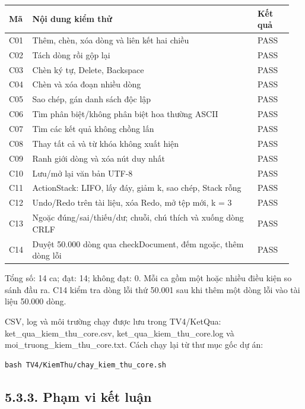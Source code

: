 \begingroup
\small
\setlength{\tabcolsep}{4pt}
\begin{longtable}{@{}p{0.07\linewidth}p{0.76\linewidth}p{0.12\linewidth}@{}}
\toprule
Mã & Nội dung kiểm thử & Kết quả \\
\midrule
\endhead
\bottomrule
\endlastfoot
C01 & Thêm, chèn, xóa dòng và liên kết hai chiều & PASS \\
C02 & Tách dòng rồi gộp lại & PASS \\
C03 & Chèn ký tự, Delete, Backspace & PASS \\
C04 & Chèn và xóa đoạn nhiều dòng & PASS \\
C05 & Sao chép, gán danh sách độc lập & PASS \\
C06 & Tìm phân biệt/không phân biệt hoa thường ASCII & PASS \\
C07 & Tìm các kết quả không chồng lấn & PASS \\
C08 & Thay tất cả và từ khóa không xuất hiện & PASS \\
C09 & Ranh giới dòng và xóa nút duy nhất & PASS \\
C10 & Lưu/mở lại văn bản UTF-8 & PASS \\
C11 & ActionStack: LIFO, lấy đáy, giảm k, sao chép, Stack rỗng & PASS \\
C12 & Undo/Redo trên tài liệu, xóa Redo, mở tệp mới, k = 3 & PASS \\
C13 & Ngoặc đúng/sai/thiếu/dư; chuỗi, chú thích và xuống dòng CRLF & PASS \\
C14 & Duyệt 50.000 dòng qua checkDocument, đếm ngoặc, thêm dòng lỗi & PASS \\
\end{longtable}
\endgroup

Tổng số: 14 ca; đạt: 14; không đạt: 0. Mỗi ca gồm một hoặc nhiều điều
kiện so sánh đầu ra. C14 kiểm tra dòng lỗi thứ 50.001 sau khi thêm một
dòng lỗi vào tài liệu 50.000 dòng.

CSV, log và môi trường chạy được lưu trong TV4/KetQua:
ket\_qua\_kiem\_thu\_core.csv, ket\_qua\_kiem\_thu\_core.log và
moi\_truong\_kiem\_thu\_core.txt. Cách chạy lại từ thư mục gốc dự án:

\begin{verbatim}
bash TV4/KiemThu/chay_kiem_thu_core.sh
\end{verbatim}

\subsection{5.3.3. Phạm vi kết
luận}\label{tv4-22-5-3-phux1ea1m-vi-kux1ebft-luux1eadn}

